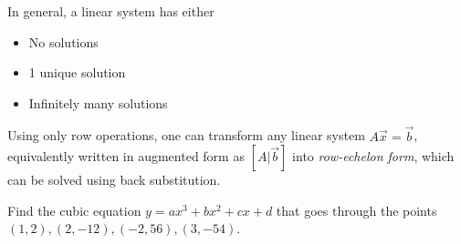 \documentclass{article}
\begin{document}
	In general, a linear system has either
	\begin{itemize}
		\item No solutions
		\item 1 unique solution
		\item Infinitely many solutions
	\end{itemize}

	Using only row operations, one can transform any linear system $ A\vec{x} = \vec{b} $, equivalently written in augmented form as $ [A | \vec{b}] $ into \textit{row-echelon form}, which can be solved using back substitution.
	
	\begin{eg}
		Find the cubic equation $ y = ax^3 + bx^2 + cx + d $ that goes through the points $ (1,2), (2,-12), (-2,56), (3,-54) $. \\
		

\end{eg}
\end{document}

